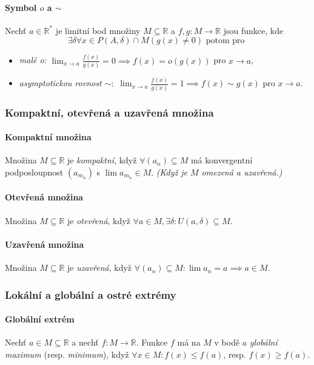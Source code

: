 \documentclass[10pt,a4paper]{article}
\newcommand{\R}{{\mathbb{R}}}
\begin{document}
\paragraph*{Symbol $o$ a $\sim$} Nechť $a \in \R^*$ je limitní bod množiny $M \subseteq \R$ a $f,g: M\to \R$ jsou funkce, kde \[\exists \delta \forall x \in P(A, \delta) \cap M(g(x) \neq 0) \text{ potom pro }\]
\begin{itemize}
    \item \textit{malé o:} $\displaystyle \lim_{x\to a} \frac{f(x)}{g(x)} = 0 \implies f(x) = o(g(x))$ pro $x\to a$,
    \item \textit{asymptotickou rovnost $\sim:$} $\displaystyle \lim_{x\to a} \frac{f(x)}{g(x)} = 1 \implies f(x) \sim g(x)$ pro $x\to a$.
\end{itemize}

\subsubsection{Kompaktní, otevřená a uzavřená množina}

\paragraph*{Kompaktní množina} Množina $M \subseteq \R$ je \textit{kompaktní}, když $\forall (a_n)\subseteq M$ má konvergentní podposloupnost $(a_{m_n})$ s $\lim a_{m_n}\in M$. \textit{(Když je $M$ omezená a uzavřená.)}
\paragraph*{Otevřená množina} Množina $M \subseteq \R$ je \textit{otevřená}, když $\forall a \in M, \exists \delta: U(a, \delta) \subseteq M$.
\paragraph*{Uzavřená množina} Množina $M \subseteq \R$ je \textit{uzavřená}, když $\forall (a_n) \subseteq M: \lim a_n = a \implies a\in M$.

\subsubsection{Lokální a globální a ostré extrémy}

\paragraph*{Globální extrém} Nechť $a\in M \subseteq \R$ a nechť $f:M\to \R$. Funkce $f$ má na $M$ v bodě $a$ \textit{globální maximum} (resp. \textit{minimum}), když $\forall x \in M: f(x) \leq f(a)$, resp. $f(x) \geq f(a)$.
\end{document}
